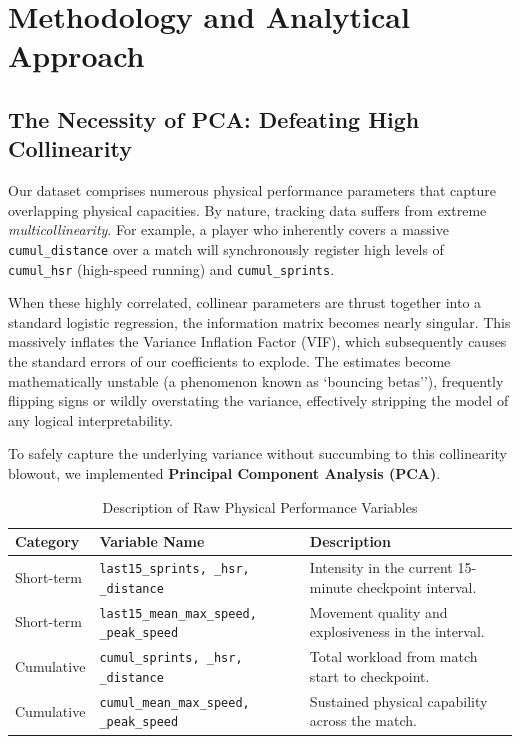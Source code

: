 \documentclass[11pt, a4paper]{article}
\begin{document}
\section{Methodology and Analytical Approach}
\label{sec:methodology}

\subsection{The Necessity of PCA: Defeating High Collinearity}
Our dataset comprises numerous physical performance parameters that capture overlapping physical capacities. By nature, tracking data suffers from extreme \textit{multicollinearity}. For example, a player who inherently covers a massive \texttt{cumul\_distance} over a match will synchronously register high levels of \texttt{cumul\_hsr} (high-speed running) and \texttt{cumul\_sprints}. 

When these highly correlated, collinear parameters are thrust together into a standard logistic regression, the information matrix becomes nearly singular. This massively inflates the Variance Inflation Factor (VIF), which subsequently causes the standard errors of our coefficients to explode. The estimates become mathematically unstable (a phenomenon known as `bouncing betas''), frequently flipping signs or wildly overstating the variance, effectively stripping the model of any logical interpretability.

To safely capture the underlying variance without succumbing to this collinearity blowout, we implemented \textbf{Principal Component Analysis (PCA)}. 

\begin{table}[H]
\centering
\caption{Description of Raw Physical Performance Variables}
\label{tab:pca_desc}
\begin{tabularx}{\textwidth}{l l X}
\toprule
\textbf{Category} & \textbf{Variable Name} & \textbf{Description} \\
\midrule
Short-term & \texttt{last15\_sprints, \_hsr, \_distance} & Intensity in the current 15-minute checkpoint interval. \\
Short-term & \texttt{last15\_mean\_max\_speed, \_peak\_speed} & Movement quality and explosiveness in the interval. \\
Cumulative & \texttt{cumul\_sprints, \_hsr, \_distance} & Total workload from match start to checkpoint. \\
Cumulative & \texttt{cumul\_mean\_max\_speed, \_peak\_speed} & Sustained physical capability across the match. \\
\bottomrule
\end{tabularx}
\end{table}
\end{document}
